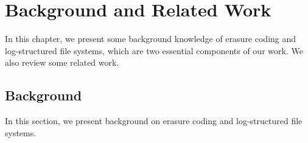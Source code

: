 \chapter{Background and Related Work}
\label{chap:background}

In this chapter, we present some background knowledge of erasure coding and
log-structured file systems, which are two essential components of our work.
We also review some related work.

\section{Background}

In this section, we present background on erasure coding and log-structured file
systems.





